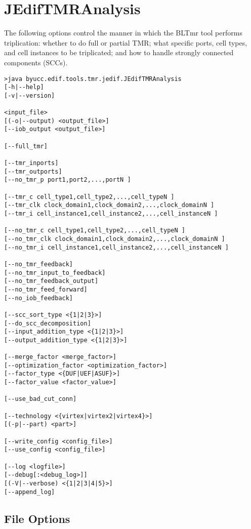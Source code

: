 \section{JEdifTMRAnalysis}

The following options control the manner in which the BLTmr tool performs
triplication: whether to do full or partial TMR; what specific ports, cell
types, and cell instances to be triplicated; and how to handle strongly
connected components (SCCs).

\begin{verbatim}
>java byucc.edif.tools.tmr.jedif.JEdifTMRAnalysis
[-h|--help] 
[-v|--version] 

<input_file> 
[(-o|--output) <output_file>] 
[--iob_output <output_file>] 

[--full_tmr] 

[--tmr_inports] 
[--tmr_outports] 
[--no_tmr_p port1,port2,...,portN ] 

[--tmr_c cell_type1,cell_type2,...,cell_typeN ] 
[--tmr_clk clock_domain1,clock_domain2,...,clock_domainN ] 
[--tmr_i cell_instance1,cell_instance2,...,cell_instanceN ] 

[--no_tmr_c cell_type1,cell_type2,...,cell_typeN ] 
[--no_tmr_clk clock_domain1,clock_domain2,...,clock_domainN ] 
[--no_tmr_i cell_instance1,cell_instance2,...,cell_instanceN ] 

[--no_tmr_feedback] 
[--no_tmr_input_to_feedback] 
[--no_tmr_feedback_output] 
[--no_tmr_feed_forward] 
[--no_iob_feedback] 

[--scc_sort_type <{1|2|3}>] 
[--do_scc_decomposition] 
[--input_addition_type <{1|2|3}>] 
[--output_addition_type <{1|2|3}>] 

[--merge_factor <merge_factor>] 
[--optimization_factor <optimization_factor>] 
[--factor_type <{DUF|UEF|ASUF}>] 
[--factor_value <factor_value>] 

[--use_bad_cut_conn] 

[--technology <{virtex|virtex2|virtex4}>] 
[(-p|--part) <part>] 

[--write_config <config_file>]
[--use_config <config_file>]

[--log <logfile>]
[--debug[:<debug_log>]]
[(-V|--verbose) <{1|2|3|4|5}>]
[--append_log]

\end{verbatim}

\subsection{File Options}

